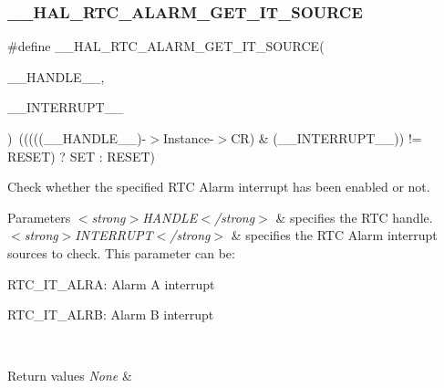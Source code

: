 \subsubsection{\texorpdfstring{\+\_\+\+\_\+\+H\+A\+L\+\_\+\+R\+T\+C\+\_\+\+A\+L\+A\+R\+M\+\_\+\+G\+E\+T\+\_\+\+I\+T\+\_\+\+S\+O\+U\+R\+CE}{\_\_HAL\_RTC\_ALARM\_GET\_IT\_SOURCE}}
{\footnotesize\ttfamily \#define \+\_\+\+\_\+\+H\+A\+L\+\_\+\+R\+T\+C\+\_\+\+A\+L\+A\+R\+M\+\_\+\+G\+E\+T\+\_\+\+I\+T\+\_\+\+S\+O\+U\+R\+CE(\begin{DoxyParamCaption}\item[{}]{\+\_\+\+\_\+\+H\+A\+N\+D\+L\+E\+\_\+\+\_\+,  }\item[{}]{\+\_\+\+\_\+\+I\+N\+T\+E\+R\+R\+U\+P\+T\+\_\+\+\_\+ }\end{DoxyParamCaption})~(((((\+\_\+\+\_\+\+H\+A\+N\+D\+L\+E\+\_\+\+\_\+)-\/$>$Instance-\/$>$CR) \& (\+\_\+\+\_\+\+I\+N\+T\+E\+R\+R\+U\+P\+T\+\_\+\+\_\+)) != R\+E\+S\+ET) ? S\+ET \+: R\+E\+S\+ET)}



Check whether the specified R\+TC Alarm interrupt has been enabled or not. 


\begin{DoxyParams}{Parameters}
{\em $<$strong$>$\+H\+A\+N\+D\+L\+E$<$/strong$>$} & specifies the R\+TC handle. \\
\hline
{\em $<$strong$>$\+I\+N\+T\+E\+R\+R\+U\+P\+T$<$/strong$>$} & specifies the R\+TC Alarm interrupt sources to check. This parameter can be\+: \begin{DoxyItemize}
\item R\+T\+C\+\_\+\+I\+T\+\_\+\+A\+L\+RA\+: Alarm A interrupt \item R\+T\+C\+\_\+\+I\+T\+\_\+\+A\+L\+RB\+: Alarm B interrupt \end{DoxyItemize}
\\
\hline
\end{DoxyParams}

\begin{DoxyRetVals}{Return values}
{\em None} & \\
\hline
\end{DoxyRetVals}
\mbox{\label{group___r_t_c___exported___macros_ga8679ec8def03e05fa39474d83b156699}} 
